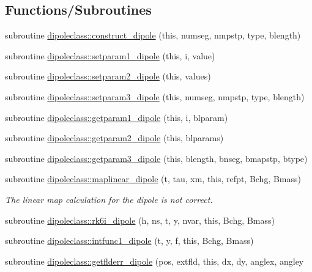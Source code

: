 \subsection*{Functions/\+Subroutines}
\begin{DoxyCompactItemize}
\item 
subroutine \mbox{\hyperlink{namespacedipoleclass_ad926e6953a9110fb9662f9d75aec0578}{dipoleclass\+::construct\+\_\+dipole}} (this, numseg, nmpstp, type, blength)
\item 
subroutine \mbox{\hyperlink{namespacedipoleclass_a88c00f58bdecf1b9c087e1fa6fe4d890}{dipoleclass\+::setparam1\+\_\+dipole}} (this, i, value)
\item 
subroutine \mbox{\hyperlink{namespacedipoleclass_af9b4f7bb26e407880166d1b7d19f8877}{dipoleclass\+::setparam2\+\_\+dipole}} (this, values)
\item 
subroutine \mbox{\hyperlink{namespacedipoleclass_a46e12e75054e010d776e23895101e223}{dipoleclass\+::setparam3\+\_\+dipole}} (this, numseg, nmpstp, type, blength)
\item 
subroutine \mbox{\hyperlink{namespacedipoleclass_af02462235721b966a71753610096e85a}{dipoleclass\+::getparam1\+\_\+dipole}} (this, i, blparam)
\item 
subroutine \mbox{\hyperlink{namespacedipoleclass_af793a317f0b5d337d6818755609641a7}{dipoleclass\+::getparam2\+\_\+dipole}} (this, blparams)
\item 
subroutine \mbox{\hyperlink{namespacedipoleclass_a6a7322bcea3d9d07affd0628002985fd}{dipoleclass\+::getparam3\+\_\+dipole}} (this, blength, bnseg, bmapstp, btype)
\item 
subroutine \mbox{\hyperlink{namespacedipoleclass_a3388afe517788e8b824b96bf49793510}{dipoleclass\+::maplinear\+\_\+dipole}} (t, tau, xm, this, refpt, Bchg, Bmass)
\begin{DoxyCompactList}\small\item\em The linear map calculation for the dipole is not correct. \end{DoxyCompactList}\item 
subroutine \mbox{\hyperlink{namespacedipoleclass_a1a92cd51d6ad864d251dd3abdc361ba8}{dipoleclass\+::rk6i\+\_\+dipole}} (h, ns, t, y, nvar, this, Bchg, Bmass)
\item 
subroutine \mbox{\hyperlink{namespacedipoleclass_ab15f3a0defc0de419f5613659abc9cad}{dipoleclass\+::intfunc1\+\_\+dipole}} (t, y, f, this, Bchg, Bmass)
\item 
subroutine \mbox{\hyperlink{namespacedipoleclass_a0a75204835a2e4dd1ea67c1ee32e62fe}{dipoleclass\+::getflderr\+\_\+dipole}} (pos, extfld, this, dx, dy, anglex, angley

\end{DoxyCompactItemize}
